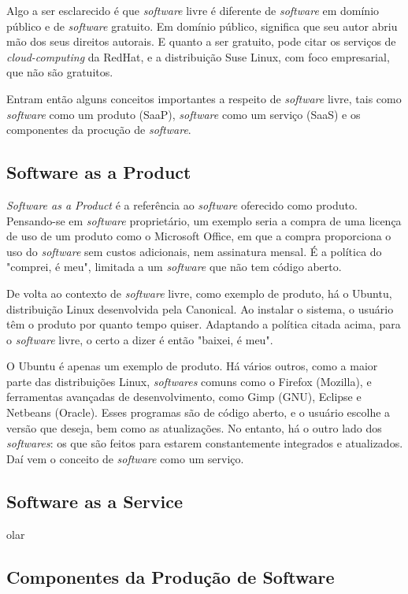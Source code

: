 \documentclass{classe_cn}                 %
\begin{document}
Algo a ser esclarecido é que \textit{software} livre é diferente de \textit{software} em domínio público e de \textit{software} gratuito. Em domínio público, significa que seu autor abriu mão dos seus direitos autorais. E quanto a ser gratuito, pode citar os serviços de \textit{cloud-computing} da RedHat, e a distribuição Suse Linux, com foco empresarial, que não são gratuitos.

Entram então alguns conceitos importantes a respeito de \textit{software} livre, tais como \textit{software} como um produto (SaaP), \textit{software} como um serviço (SaaS) e os componentes da procução de \textit{software}.


\subsection{Software as a Product}

\textit{Software as a Product} é a referência ao \textit{software} oferecido como produto. Pensando-se em \textit{software} proprietário, um exemplo seria a compra de uma licença de uso de um produto como o Microsoft Office, em que a compra proporciona o uso do \textit{software} sem custos adicionais, nem assinatura mensal. É a política do "comprei, é meu", limitada a um \textit{software} que não tem código aberto.

De volta ao contexto de \textit{software} livre, como exemplo de produto, há o Ubuntu, distribuição Linux desenvolvida pela Canonical. Ao instalar o sistema, o usuário têm o produto por quanto tempo quiser. Adaptando a política citada acima, para o \textit{software} livre, o certo a dizer é então "baixei, é meu".

O Ubuntu é apenas um exemplo de produto. Há vários outros, como a maior parte das distribuições Linux, \textit{softwares} comuns como o Firefox (Mozilla), e ferramentas avançadas de desenvolvimento, como Gimp (GNU), Eclipse e Netbeans (Oracle). Esses programas são de código aberto, e o usuário escolhe a versão que deseja, bem como as atualizações. No entanto, há o outro lado dos \textit{softwares}: os que são feitos para estarem constantemente integrados e atualizados. Daí vem o conceito de \textit{software} como um serviço.

\subsection{Software as a Service}

olar

\subsection{Componentes da Produção de Software}
\end{document}
